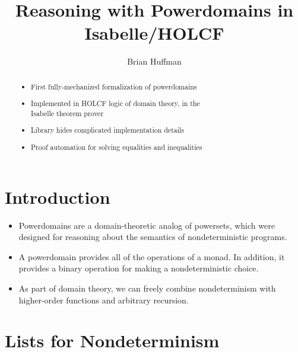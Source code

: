 \documentclass[portrait]{sciposter}
\title{Reasoning with Powerdomains in Isabelle/HOLCF}
\author{Brian Huffman}
\institute{Department of Computer Science,\\
  Portland State University, Portland, Oregon}
\begin{document}

\maketitle

\begin{multicols}{3}

\begin{abstract}
\begin{sectionbox}{}
\begin{itemize}
\item First fully-mechanized formalization of powerdomains
\item Implemented in HOLCF logic of domain theory, in the\\ Isabelle theorem prover
\item Library hides complicated implementation details
\item Proof automation for solving equalities and inequalities
\end{itemize}
\end{sectionbox}
\end{abstract}

\section{Introduction}
\begin{itemize}
\item Powerdomains are a domain-theoretic analog of powersets, which were designed for reasoning about the semantics of nondeterministic programs.
\item A powerdomain provides all of the operations of a monad. In addition, it provides a binary operation for making a nondeterministic choice.
\item As part of domain theory, we can freely combine nondeterminism with higher-order functions and arbitrary recursion.
\end{itemize}

\section{Lists for Nondeterminism}


\end{multicols}
\end{document}
